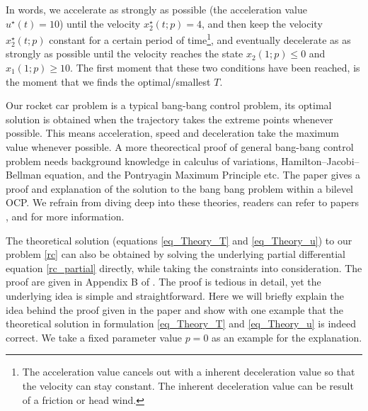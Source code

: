 \documentclass  [
  paper    = a4,
  BCOR     = 10mm,
  twoside,
  fontsize = 12pt,
  fleqn,
  toc      = bibnumbered,
  toc      = listofnumbered,
  numbers  = noendperiod,
  headings = normal,
  listof   = leveldown,
  version  = 3.03
]                                       {scrreprt}
\newcommand{\<}{\langle}
\renewcommand{\>}{\rangle}
\begin{document}
In words, we accelerate as strongly as possible (the acceleration value $u^\star(t)=10$) until the velocity $x^\star_2(t;p)=4$, and then keep the velocity $x^\star_2(t;p)$ constant for a certain period of time\footnote{The acceleration value cancels out with a inherent deceleration value so that the velocity can stay constant. The inherent deceleration value can be result of a friction or head wind.}, and eventually decelerate as as strongly as possible until the velocity reaches the state $x_2(1;p) \leq 0$ and $x_1(1;p) \geq 10$. The first moment that these two conditions have been reached, is the moment that we finds the optimal/smallest $T$.




Our rocket car problem is a typical bang-bang control problem, its optimal solution is obtained when the trajectory takes the extreme points whenever possible. This means acceleration, speed and deceleration take the maximum value whenever possible. A more theorectical proof of general bang-bang control problem needs background knowledge in calculus of variations, Hamilton–Jacobi–Bellman equation, and the Pontryagin Maximum Principle etc. The paper \cite{KM16} gives a proof and explanation of the solution to the bang bang problem within a bilevel OCP. We refrain from diving deep into these theories, readers can refer to papers \cite{EJ89}, \cite{RV99} and \cite{BD05} for more information. 
 
The theoretical solution (equations \ref{eq_Theory_T} and \ref{eq_Theory_u}) to our problem \ref{rc} can also be obtained by solving the underlying partial differential equation \ref{rc_partial} directly, while taking the constraints into consideration. The proof are given in Appendix B of \cite{MatSch22}. The proof is tedious in detail, yet the underlying idea is simple and straightforward. Here we will briefly explain the idea behind the proof given in the paper \cite{MatSch22} and show with one example that the theoretical solution in formulation \ref{eq_Theory_T} and \ref{eq_Theory_u} is indeed correct. We take a fixed parameter value $p=0$ as an example for the explanation.
\end{document}
